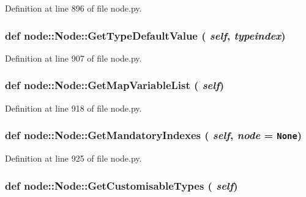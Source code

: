 Definition at line 896 of file node.py.\hypertarget{classnode_1_1Node_7d876e328f58d315357d0da9525bd64a}{
\subsubsection[GetTypeDefaultValue]{\setlength{\rightskip}{0pt plus 5cm}def node::Node::Get\-Type\-Default\-Value ( {\em self},  {\em typeindex})}}
\label{classnode_1_1Node_7d876e328f58d315357d0da9525bd64a}




Definition at line 907 of file node.py.\hypertarget{classnode_1_1Node_494cd12b234273d9c2f0a428defe0028}{
\subsubsection[GetMapVariableList]{\setlength{\rightskip}{0pt plus 5cm}def node::Node::Get\-Map\-Variable\-List ( {\em self})}}
\label{classnode_1_1Node_494cd12b234273d9c2f0a428defe0028}




Definition at line 918 of file node.py.\hypertarget{classnode_1_1Node_6630247aaffdec3448b81c294c5d69e5}{
\subsubsection[GetMandatoryIndexes]{\setlength{\rightskip}{0pt plus 5cm}def node::Node::Get\-Mandatory\-Indexes ( {\em self},  {\em node} = {\tt None})}}
\label{classnode_1_1Node_6630247aaffdec3448b81c294c5d69e5}




Definition at line 925 of file node.py.\hypertarget{classnode_1_1Node_7495e3fdf396ee2ab1f7472c9682d007}{
\subsubsection[GetCustomisableTypes]{\setlength{\rightskip}{0pt plus 5cm}def node::Node::Get\-Customisable\-Types ( {\em self})}}
\label{classnode_1_1Node_7495e3fdf396ee2ab1f7472c9682d007}




